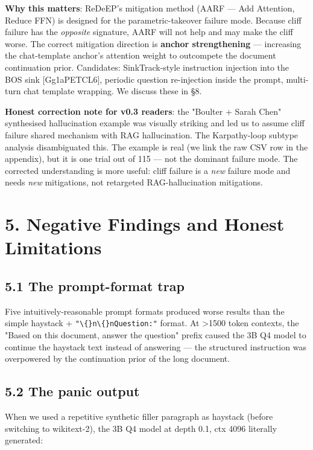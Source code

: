 \documentclass[11pt]{article}
\begin{document}
\textbf{Why this matters}: ReDeEP's mitigation method (AARF — Add Attention, Reduce FFN) is designed for the parametric-takeover failure mode. Because cliff failure has the \textit{opposite} signature, AARF will not help and may make the cliff worse. The correct mitigation direction is \textbf{anchor strengthening} — increasing the chat-template anchor's attention weight to outcompete the document continuation prior. Candidates: SinkTrack-style instruction injection into the BOS sink [Gg1aPETCL6], periodic question re-injection inside the prompt, multi-turn chat template wrapping. We discuss these in §8.


\textbf{Honest correction note for v0.3 readers}: the "Boulter + Sarah Chen" synthesised hallucination example was visually striking and led us to assume cliff failure shared mechanism with RAG hallucination. The Karpathy-loop subtype analysis disambiguated this. The example is real (we link the raw CSV row in the appendix), but it is one trial out of 115 — not the dominant failure mode. The corrected understanding is more useful: cliff failure is a \textit{new} failure mode and needs \textit{new} mitigations, not retargeted RAG-hallucination mitigations.


\section*{5. Negative Findings and Honest Limitations}


\subsection*{5.1 The prompt-format trap}


Five intuitively-reasonable prompt formats produced worse results than the simple haystack + \texttt{"\textbackslash\{\}n\textbackslash\{\}nQuestion:"} format. At >1500 token contexts, the "Based on this document, answer the question" prefix caused the 3B Q4 model to continue the haystack text instead of answering — the structured instruction was overpowered by the continuation prior of the long document.


\subsection*{5.2 The panic output}


When we used a repetitive synthetic filler paragraph as haystack (before switching to wikitext-2), the 3B Q4 model at depth 0.1, ctx 4096 literally generated:
\end{document}

